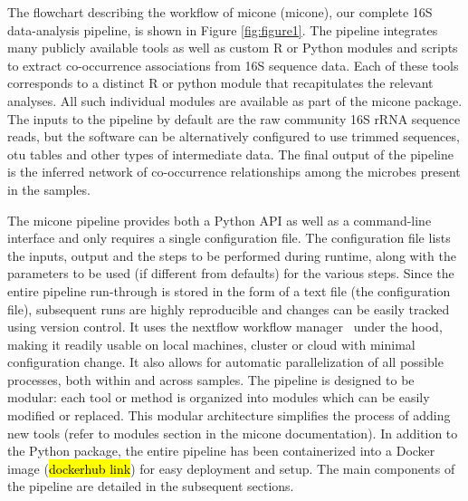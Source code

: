   \vspace{-5mm}
  The flowchart describing the workflow of \ac{micone} (\acl{micone}), our complete 16S data-analysis pipeline, is shown in Figure \ref{fig:figure1}.
  The pipeline integrates many publicly available tools as well as custom R or Python modules and scripts to extract co-occurrence associations from 16S sequence data.
  Each of these tools corresponds to a distinct R or python module that recapitulates the relevant analyses.
  All such individual modules are available as part of the \ac{micone} package.
  The inputs to the pipeline by default are the raw community 16S rRNA sequence reads, but the software can be alternatively configured to use trimmed sequences, \ac{otu} tables and other types of intermediate data.
  The final output of the pipeline is the inferred network of co-occurrence relationships among the microbes present in the samples.

  The \ac{micone} pipeline provides both a Python API as well as a command-line interface and only requires a single configuration file.
  The configuration file lists the inputs, output and the steps to be performed during runtime, along with the parameters to be used (if different from defaults) for the various steps.
  Since the entire pipeline run-through is stored in the form of a text file (the configuration file), subsequent runs are highly reproducible and changes can be easily tracked using version control.
  It uses the nextflow workflow manager~\cite{Tommaso2015} under the hood, making it readily usable on local machines, cluster or cloud with minimal configuration change.
  It also allows for automatic parallelization of all possible processes, both within and across samples.
  The pipeline is designed to be modular: each tool or method is organized into modules which can be easily modified or replaced.
  This modular architecture simplifies the process of adding new tools (refer to modules section in the \ac{micone} documentation).
  In addition to the Python package, the entire pipeline has been containerized into a Docker~\cite{Merkel1994} image (\hl{dockerhub link}) for easy deployment and setup.
  The main components of the pipeline are detailed in the subsequent sections.

